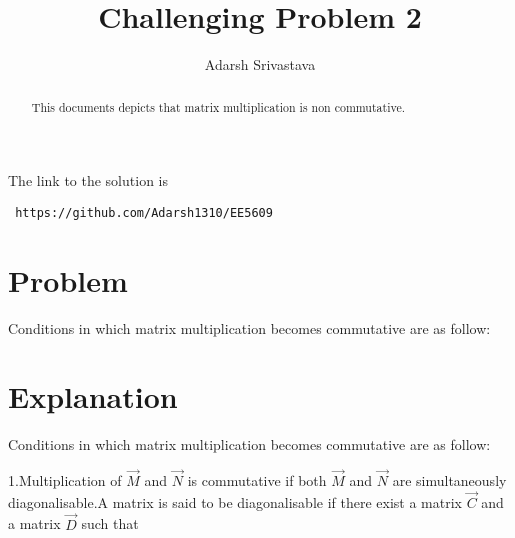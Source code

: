 \documentclass[journal,12pt,twocolumn]{IEEEtran}
\begin{document}
     \def\rightbox#1{\makebox[0in][r]{#1}}
     \def\centbox#1{\makebox[0in]{#1}}
     \def\topbox#1{\raisebox{-\baselineskip}[0in][0in]{#1}}
     \def\midbox#1{\raisebox{-0.5\baselineskip}[0in][0in]{#1}}
\vspace{3cm}
\title{Challenging Problem 2}
\author{Adarsh Srivastava}
\maketitle
\newpage
\bigskip
\renewcommand{\thetable}{\theenumi}
The link to the solution is
\begin{lstlisting}
 https://github.com/Adarsh1310/EE5609
\end{lstlisting}
\begin{abstract}
This documents depicts that matrix multiplication is non commutative.
\end{abstract}
\section{\textbf{Problem}}

Conditions in which matrix multiplication becomes commutative are as follow:
\section{\textbf{Explanation}}

Conditions in which matrix multiplication becomes commutative are as follow:

1.Multiplication of $\vec{M}$ and $\vec{N}$ is commutative if both $\vec{M}$ and $\vec{N}$ are simultaneously diagonalisable.A matrix is said to be diagonalisable if there exist a matrix $\vec{C}$ and a matrix $\vec{D}$ such that
\end{document}
